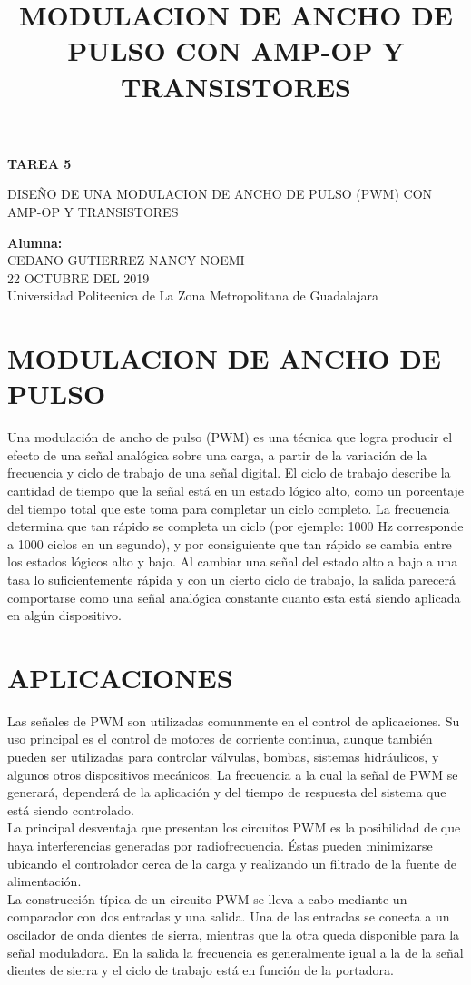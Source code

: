 \documentclass[11pt,a4paper]{article}
\begin{document}
\begin{center}
\textbf{TAREA 5}\\
\title{MODULACION DE ANCHO DE PULSO CON AMP-OP Y TRANSISTORES}
DISEÑO DE UNA MODULACION DE ANCHO DE PULSO (PWM) CON AMP-OP Y TRANSISTORES 
\end{center}

\begin{center}
\textbf{Alumna:}\\
CEDANO GUTIERREZ NANCY NOEMI\\
22 OCTUBRE DEL 2019\\
Universidad Politecnica de La Zona Metropolitana de Guadalajara
\end{center}

\section{MODULACION DE ANCHO DE PULSO}
Una modulación de ancho de pulso (PWM) es una técnica que logra producir el efecto de una señal analógica sobre una carga, a partir de la variación de la frecuencia y ciclo de trabajo de una señal digital. 
El ciclo de trabajo describe la cantidad de tiempo que la señal está en un estado lógico alto, como un porcentaje del tiempo total que este toma para completar un ciclo completo. La frecuencia determina que tan rápido se completa un ciclo (por ejemplo: 1000 Hz corresponde a 1000 ciclos en un segundo), y por consiguiente que tan rápido se cambia entre los estados lógicos alto y bajo. Al cambiar una señal del estado alto a bajo a una tasa lo suficientemente rápida y con un cierto ciclo de trabajo, la salida parecerá comportarse como una señal analógica constante cuanto esta está siendo aplicada en algún dispositivo.\\
\section{APLICACIONES}
Las señales de PWM son utilizadas comunmente en el control de aplicaciones. Su uso principal es el control de motores de corriente continua, aunque también pueden ser utilizadas para controlar válvulas, bombas, sistemas hidráulicos, y algunos otros dispositivos mecánicos. La frecuencia a la cual la señal de PWM se generará, dependerá de la aplicación y del tiempo de respuesta del sistema que está siendo controlado.\\
La principal desventaja que presentan los circuitos PWM es la posibilidad de que haya interferencias generadas por radiofrecuencia. Éstas pueden minimizarse ubicando el controlador cerca de la carga y realizando un filtrado de la fuente de alimentación.\\
La construcción típica de un circuito PWM se lleva a cabo mediante un comparador con dos entradas y una salida. Una de las entradas se conecta a un oscilador de onda dientes de sierra, mientras que la otra queda disponible para la señal moduladora. En la salida la frecuencia es generalmente igual a la de la señal dientes de sierra y el ciclo de trabajo está en función de la portadora.\\
\end{document}
